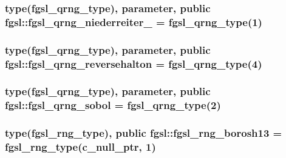 \hypertarget{classfgsl_a3b034ddb20e620b652a5fe35050c0beb}{
\subsubsection[{fgsl\-\_\-qrng\-\_\-niederreiter\-\_\-2}]{\setlength{\rightskip}{0pt plus 5cm}type({\bf fgsl\-\_\-qrng\-\_\-type}), parameter, public fgsl\-::fgsl\-\_\-qrng\-\_\-niederreiter\-\_ = {\bf fgsl\-\_\-qrng\-\_\-type}(1)}}\label{classfgsl_a3b034ddb20e620b652a5fe35050c0beb}
\hypertarget{classfgsl_a871225c291532b659185f193d97a976a}{
\subsubsection[{fgsl\-\_\-qrng\-\_\-reversehalton}]{\setlength{\rightskip}{0pt plus 5cm}type({\bf fgsl\-\_\-qrng\-\_\-type}), parameter, public fgsl\-::fgsl\-\_\-qrng\-\_\-reversehalton = {\bf fgsl\-\_\-qrng\-\_\-type}(4)}}\label{classfgsl_a871225c291532b659185f193d97a976a}
\hypertarget{classfgsl_ae1c1dcc2273c7307b2f972c9f04ab69f}{
\subsubsection[{fgsl\-\_\-qrng\-\_\-sobol}]{\setlength{\rightskip}{0pt plus 5cm}type({\bf fgsl\-\_\-qrng\-\_\-type}), parameter, public fgsl\-::fgsl\-\_\-qrng\-\_\-sobol = {\bf fgsl\-\_\-qrng\-\_\-type}(2)}}\label{classfgsl_ae1c1dcc2273c7307b2f972c9f04ab69f}
\hypertarget{classfgsl_afcf3a859944205f1a11e0dc35e13e608}{
\subsubsection[{fgsl\-\_\-rng\-\_\-borosh13}]{\setlength{\rightskip}{0pt plus 5cm}type({\bf fgsl\-\_\-rng\-\_\-type}), public fgsl\-::fgsl\-\_\-rng\-\_\-borosh13 = {\bf fgsl\-\_\-rng\-\_\-type}(c\-\_\-null\-\_\-ptr, 1)}}\label{classfgsl_afcf3a859944205f1a11e0dc35e13e608}
